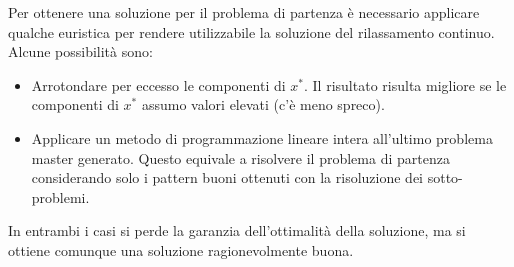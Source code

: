 Per ottenere una soluzione per il problema di partenza è necessario applicare qualche euristica per rendere utilizzabile la soluzione del rilassamento continuo.
Alcune possibilità sono:

\begin{itemize}
	\item Arrotondare per eccesso le componenti di $x^*$. Il risultato risulta migliore se le componenti di $x^*$ assumo valori elevati (c'è meno spreco).
	\item Applicare un metodo di programmazione lineare intera all'ultimo problema master generato. Questo equivale a risolvere il problema di partenza considerando solo i pattern buoni ottenuti con la risoluzione dei sotto-problemi.
\end{itemize}

In entrambi i casi si perde la garanzia dell'ottimalità della soluzione, ma si ottiene comunque una soluzione ragionevolmente buona.




